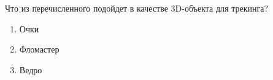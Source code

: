 
Что из перечисленного подойдет в качестве 3D-объекта для трекинга?


\begin{enumerate}
    \item Очки
    \item Фломастер
    \item Ведро
\end{enumerate}

